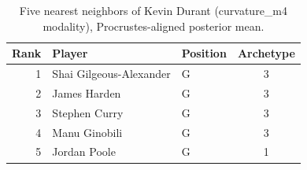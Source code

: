 \begin{table}[htbp]
  \centering\small
  \begin{tabular}{rllc}
    \toprule
    Rank & Player & Position & Archetype \\
    \midrule
    1 & Shai Gilgeous-Alexander & G & 3 \\
    2 & James Harden & G & 3 \\
    3 & Stephen Curry & G & 3 \\
    4 & Manu Ginobili & G & 3 \\
    5 & Jordan Poole & G & 1 \\
    \bottomrule
  \end{tabular}
  \caption{Five nearest neighbors of Kevin Durant (curvature_m4 modality), Procrustes-aligned posterior mean.}
  \label{tab:Kevin_Durant_neighbors_curvature_m4}
\end{table}

